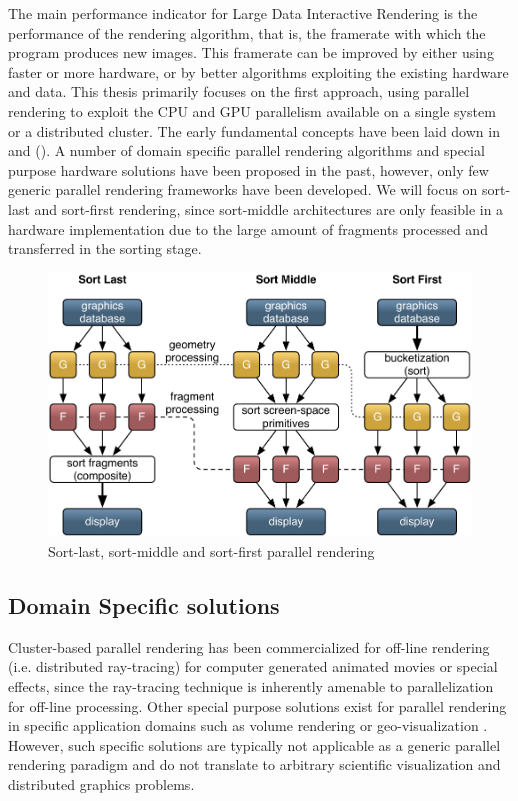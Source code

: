 The main performance indicator for Large Data Interactive Rendering is the
performance of the rendering algorithm, that is, the framerate with which the
program produces new images. This framerate can be improved by either using
faster or more hardware, or by better algorithms exploiting the existing
hardware and data. This thesis primarily focuses on the first approach, using
parallel rendering to exploit the CPU and GPU parallelism available on a single
system or a distributed cluster. The early fundamental concepts have been laid
down in \cite{MCEF:94} and \cite{Crockett:97} (). A number of
domain specific parallel rendering algorithms and special purpose hardware
solutions have been proposed in the past, however, only few generic parallel
rendering frameworks have been developed. We will focus on sort-last and
sort-first rendering, since sort-middle architectures are only feasible in a
hardware implementation due to the large amount of fragments processed and
transferred in the sorting stage.

\begin{figure}[h!t]\center
 \includegraphics[width=\textwidth]{images/all_sorts}%
 \caption{Sort-last, sort-middle and sort-first parallel rendering\label{fSorts}}
\end{figure}


\subsection{Domain Specific solutions}

Cluster-based parallel rendering has been commercialized for off-line rendering
(i.e. distributed ray-tracing) for computer generated animated movies or special
effects, since the ray-tracing technique is inherently amenable to
parallelization for off-line processing. Other special purpose solutions exist
for parallel rendering in specific application domains such as volume rendering
\cite{LWMT:97,Wittenbrink:98,HSCSM:00,SL:02,GS:02,NSJLYZ:05} or
geo-visualization \cite{VR:91,AG:95,LDC:96,JLMV:06}. However, such specific
solutions are typically not applicable as a generic parallel rendering paradigm
and do not translate to arbitrary scientific visualization and distributed
graphics problems.

